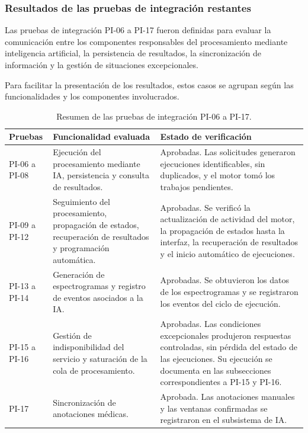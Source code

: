 \subsubsection{Resultados de las pruebas de integración restantes}

Las pruebas de integración PI-06 a PI-17 fueron definidas
para evaluar la comunicación entre los componentes
responsables del procesamiento mediante inteligencia
artificial, la persistencia de resultados, la sincronización
de información y la gestión de situaciones excepcionales.

Para facilitar la presentación de los resultados, estos
casos se agrupan según las funcionalidades y los
componentes involucrados.

\begin{table}[htbp]
\centering
\caption{Resumen de las pruebas de integración PI-06 a PI-17.}
\label{tab:resumen_pruebas_integracion}
\small
\begin{tabular}{|p{1.5cm}|p{4cm}|p{6cm}|}
\hline
\textbf{Pruebas} &
\centering\arraybackslash\textbf{Funcionalidad evaluada} &
\textbf{Estado de verificación} \\ \hline

PI-06 a PI-08 &
Ejecución del procesamiento mediante IA,
persistencia y consulta de resultados. &
Aprobadas. Las solicitudes generaron ejecuciones identificables, sin duplicados, y el motor tomó los trabajos pendientes. \\ \hline

PI-09 a PI-12 &
Seguimiento del procesamiento, propagación de
estados, recuperación de resultados y programación
automática. &
Aprobadas. Se verificó la actualización de actividad del motor, la propagación de estados hasta la interfaz, la recuperación de resultados y el inicio automático de ejecuciones. \\ \hline

PI-13 a PI-14 &
Generación de espectrogramas y registro
de eventos asociados a la IA. &
Aprobadas. Se obtuvieron los datos de los espectrogramas y se registraron los eventos del ciclo de ejecución. \\ \hline

PI-15 a PI-16 &
Gestión de indisponibilidad del servicio
y saturación de la cola de procesamiento. &
Aprobadas. Las condiciones excepcionales produjeron respuestas controladas, sin pérdida del estado de las ejecuciones. Su ejecución se documenta en las subsecciones correspondientes a PI-15 y PI-16. \\ \hline

PI-17 &
Sincronización de anotaciones médicas. &
Aprobada. Las anotaciones manuales y las ventanas confirmadas se registraron en el subsistema de IA. \\ \hline

\end{tabular}
\end{table}

